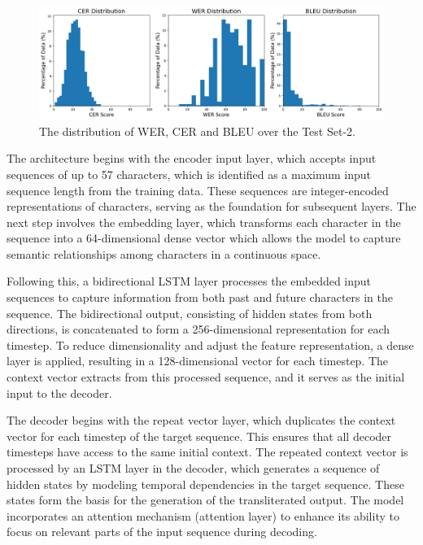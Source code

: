 \documentclass[11pt]{article}
\begin{document}
\begin{figure}[!htpb]
  \includegraphics[width=\textwidth]{IndoNLP2_test.png}
  \caption{The distribution of WER, CER and BLEU over the Test Set-2.}
  \label{fig:test2}
\end{figure}

The architecture begins with the encoder input layer, which accepts input sequences of up to 57 characters, which is identified as a maximum input sequence length from the training data. These sequences are integer-encoded representations of characters, serving as the foundation for subsequent layers. The next step involves the embedding layer, which transforms each character in the sequence into a 64-dimensional dense vector which allows the model to capture semantic relationships among characters in a continuous space. 


Following this, a bidirectional LSTM layer processes the embedded input sequences to capture information from both past and future characters in the sequence. The bidirectional output, consisting of hidden states from both directions, is concatenated to form a 256-dimensional representation for each timestep. To reduce dimensionality and adjust the feature representation, a dense layer is applied, resulting in a 128-dimensional vector for each timestep. The context vector extracts from this processed sequence, and it serves as the initial input to the decoder.

The decoder begins with the repeat vector layer, which duplicates the context vector for each timestep of the target sequence. This ensures that all decoder timesteps have access to the same initial context. The repeated context vector is processed by an LSTM layer in the decoder, which generates a sequence of hidden states by modeling temporal dependencies in the target sequence. These states form the basis for the generation of the transliterated output. The model incorporates an attention mechanism (attention layer) to enhance its ability to focus on relevant parts of the input sequence during decoding. 
\end{document}
